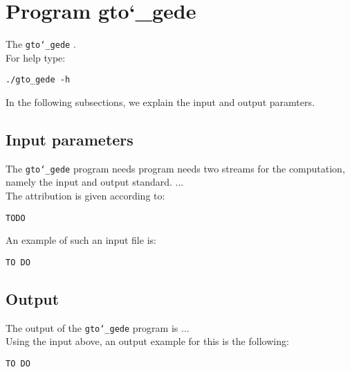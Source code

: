 \section{Program gto\char`_gede}
The \texttt{gto\char`_gede} .\\
For help type:
\begin{lstlisting}
./gto_gede -h
\end{lstlisting}
In the following subsections, we explain the input and output paramters.

\subsection*{Input parameters}

The \texttt{gto\char`_gede} program needs program needs two streams for the computation, namely the input and output standard. ...\\
The attribution is given according to:
\begin{lstlisting}
TODO
\end{lstlisting}
An example of such an input file is:
\begin{lstlisting}
TO DO
\end{lstlisting}

\subsection*{Output}
The output of the \texttt{gto\char`_gede} program is ...\\
Using the input above, an output example for this is the following:
\begin{lstlisting}
TO DO
\end{lstlisting}